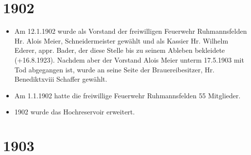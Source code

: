 \documentclass[12pt,a4paper]{book}
\begin{document}
\section*{1902}

\begin{itemize}
\item Am 12.1.1902 wurde als Vorstand der freiwilligen Feuerwehr
Ruhmannsfelden Hr. Alois Meier, Schneidermeister gewählt und als Kassier
Hr. Wilhelm Ederer, appr. Bader, der diese Stelle bis zu seinem Ableben
bekleidete (+16.8.1923). Nachdem aber der Vorstand Alois Meier unterm
17.5.1903 mit Tod abgegangen ist, wurde an seine Seite der
Brauereibesitzer, Hr. Benediktxviii Schaffer gewählt.

\item Am 1.1.1902 hatte die freiwillige Feuerwehr Ruhmannsfelden 55
Mitglieder.

\item 1902 wurde das Hochreservoir erweitert.
\end{itemize}

\section*{1903}
\end{document}
